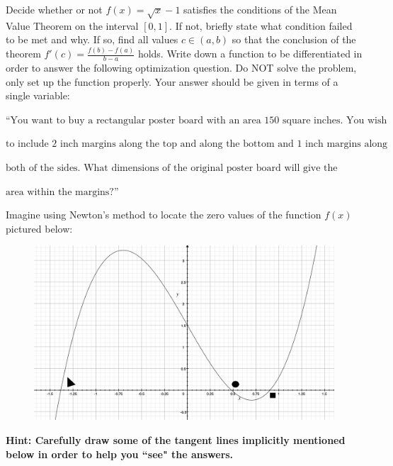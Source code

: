\documentclass[11pt]{exam}
\begin{document}
\begin{questions}
\begin{parts}
\end{parts}
\newpage


\question[8] %
Decide whether or not $f(x)=\sqrt{x}-1$ satisfies the conditions of the Mean Value Theorem on the interval $[0,1]$. If not, briefly state what condition failed to be met and why. If so, find all values $c\in(a,b)$ so that the conclusion of the theorem $f'(c)=\frac{f(b)-f(a)}{b-a}$ holds.
\vfill
\question[6] Write down a function to be differentiated in order to answer the following optimization question. Do NOT solve the problem, only set up the function properly. Your answer should be given in terms of a single variable:

$\text{``You want to buy a rectangular poster board with an area }150\text{ square inches. You wish}$

$\text{to include }2\text{ inch margins along the top and along the bottom and }1\text{ inch margins along}$

$\text{both of the sides. What dimensions of the original poster board will give the largest}$

$\text{area within the margins?''}$

\vspace{6cm}




\newpage



\question %
Imagine using Newton’s method to locate the zero values of the function $f(x)$ pictured below:
\begin{figure}[h!]
    \centering
    \includegraphics[scale=.45]{graph.png}
\end{figure}

\textbf{Hint: Carefully draw some of the tangent lines implicitly mentioned below in order to help you ``see" the answers.}
\begin{parts}

\end{parts}
\end{questions}
\end{document}

